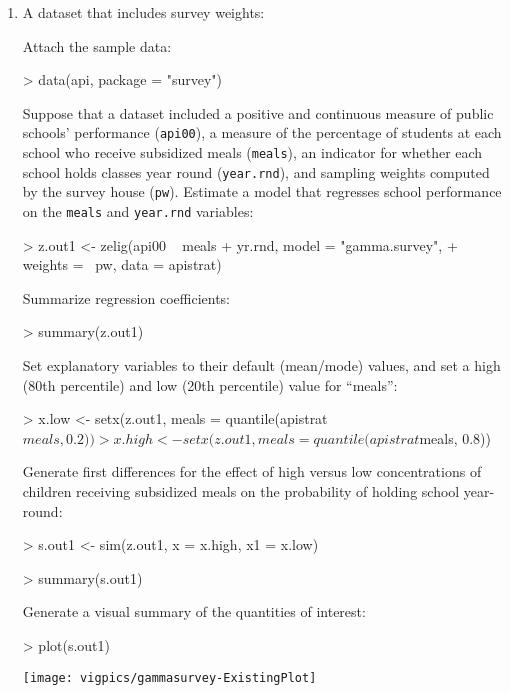 \begin{enumerate} 

\item A dataset that includes survey weights:

Attach the sample data: 
\begin{Schunk}
\begin{Sinput}
> data(api, package = "survey")
\end{Sinput}
\end{Schunk}

Suppose that a dataset included a positive and continuous measure of
public schools' performance ({\tt api00}), a measure of 
the percentage of students at each school who receive subsidized 
meals ({\tt meals}), an indicator for whether each school
holds classes year round ({\tt year.rnd}), and sampling 
weights computed by the survey house ({\tt pw}).  Estimate a model
that regresses school performance on the {\tt meals} and {\tt year.rnd}
variables:
\begin{Schunk}
\begin{Sinput}
> z.out1 <- zelig(api00 ~ meals + yr.rnd, model = "gamma.survey", 
+     weights = ~pw, data = apistrat)
\end{Sinput}
\end{Schunk}
Summarize regression coefficients:
\begin{Schunk}
\begin{Sinput}
> summary(z.out1)
\end{Sinput}
\end{Schunk}
Set explanatory variables to their default (mean/mode) values, and
set a high (80th percentile) and low (20th percentile) value for
``meals'': 
\begin{Schunk}
\begin{Sinput}
> x.low <- setx(z.out1, meals = quantile(apistrat$meals, 0.2))
> x.high <- setx(z.out1, meals = quantile(apistrat$meals, 0.8))
\end{Sinput}
\end{Schunk}
Generate first differences for the
effect of high versus low concentrations of children receiving
subsidized meals on the probability of holding school year-round: 
\begin{Schunk}
\begin{Sinput}
> s.out1 <- sim(z.out1, x = x.high, x1 = x.low)
\end{Sinput}
\end{Schunk}
\begin{Schunk}
\begin{Sinput}
> summary(s.out1)
\end{Sinput}
\end{Schunk}
Generate a visual summary of the quantities of interest:
\begin{center}
\begin{Schunk}
\begin{Sinput}
> plot(s.out1)
\end{Sinput}
\end{Schunk}
\texttt{[image: vigpics/gammasurvey-ExistingPlot]}
\end{center}


\end{enumerate}
